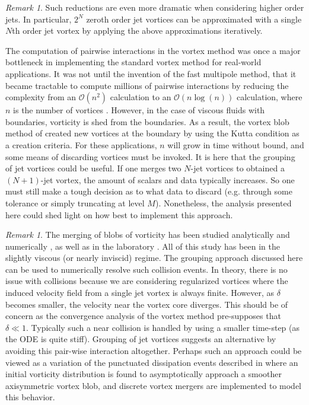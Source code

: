 \documentclass[12pt]{amsart}
\theoremstyle{remark}
\newtheorem{rmk}[thm]{Remark}
\begin{document}
\begin{rmk}
Such reductions are even more dramatic when considering higher order jets.
In particular, $2^N$ zeroth order jet vortices can be approximated with a single $N$th order jet vortex by applying the above approximations iteratively.

The computation of pairwise interactions in the vortex method was once a major bottleneck in implementing the standard vortex method for real-world applications.
It was not until the invention of the fast multipole method, that it became tractable to compute millions of pairwise interactions by
reducing the complexity from an $\mathcal{O}(n^2)$ calculation to an $\mathcal{O}(n \log (n))$ calculation, where $n$ is the number of vortices \cite{GreengardRokhlin1987}.
However, in the case of viscous fluids with boundaries, vorticity is shed from the boundaries.
As a result, the vortex blob method of \cite{Chorin1973} created new vortices at the boundary by using the Kutta condition as a creation criteria.
For these applications, $n$ will grow in time without bound, and some means of discarding vortices must be invoked.
It is here that the grouping of jet vortices  could be useful.
If one merges two $N$-jet vortices to obtained a $(N+1)$-jet vortex, the amount of scalars and data typically increases.
So one must still make a tough decision as to what data to discard (e.g. through some tolerance or simply truncating at level $M$).
Nonetheless, the analysis presented here could shed light on how best to implement this approach.
\end{rmk}

\begin{rmk}
The merging of blobs of vorticity has been studied analytically \cite{MelanderZabuskyMcWilliams1998} and 
numerically \cite{WeissMcWilliams1993,MelanderZabuskyMcWilliams1998,DizesVerga2002},
as well as in the laboratory \cite{FineDriscollMalmbergMitchell1991}.
All of this study has been in the slightly viscous (or nearly inviscid) regime.
The grouping approach discussed here can be used to numerically resolve such collision events.
In theory, there is no issue with collisions because we are considering regularized vortices where
the induced velocity field from a single jet vortex is always finite.
However, as $\delta$ becomes smaller, the velocity near the vortex core diverges.
This should be of concern as the convergence analysis of the vortex method pre-supposes that $\delta \ll 1$.
Typically such a near collision is handled by using a smaller time-step (as the ODE is quite stiff).
Grouping of jet vortices suggests an alternative by avoiding this pair-wise interaction altogether.
Perhaps such an approach could be viewed as a variation of the punctuated dissipation events
described in \cite{WeissMcWilliams1993} where an initial vorticity distribution is found to asymptotically
approach a smoother axisymmetric vortex blob,
and discrete vortex mergers are implemented to model this behavior.
\end{rmk}
\end{document}
